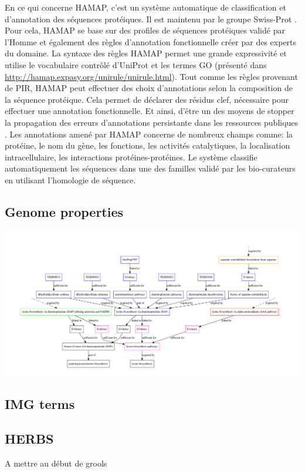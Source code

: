 \begin{refsegment}
    En ce qui concerne \gls{HAMAP}, c'est un système automatique de classification et d'annotation des séquences protéiques. Il est maintenu par le groupe Swiss-Prot . Pour cela, \gls{HAMAP} se base sur des profiles de séquences protéiques validé par l'Homme et également des règles d'annotation fonctionnelle créer par des experts du domaine. La syntaxe des règles  \gls{HAMAP} permet une grande expressivité et utilise le vocabulaire contrôlé d'UniProt et les termes \gls{GO} (présenté dans \url{http://hamap.expasy.org/unirule/unirule.html}). Tout comme les règles provenant de \gls{PIR}, \gls{HAMAP} peut effectuer des choix d'annotations selon la composition de la séquence protéique. Cela permet de déclarer des résidus clef, nécessaire pour effectuer une annotation fonctionnelle. Et ainsi, d'être un des moyens de stopper la propagation des erreurs d'annotations persistante dans les ressources publiques \cite{schnoes2009annotation,devos2001intrinsic,bell2013can,gilks2002modeling}. Les annotations amené par \gls{HAMAP} concerne de nombreux champs comme: la protéine, le nom du gène, les fonctions, les activités catalytiques, la localisation intracellulaire, les interactions protéines-protéines. Le système classifie automatiquement les séquences dans une des familles validé par les bio-curateurs en utilisant l'homologie de séquence.
    
    \subsection{Genome properties}
    \begin{shadedfigure}
        \centering
        \includegraphics[width=\textwidth]{img/lysine_biosynthesis.pdf}
        \caption{  }
        \label{fig:gp_lysine}
    \end{shadedfigure}
    
    \subsection{IMG terms}
    \subsection{HERBS}
    A mettre au début de grools
    
    \subbibliography
\end{refsegment}